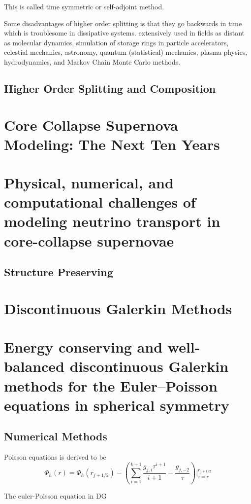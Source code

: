 This is called time symmetric or self-adjoint method.

Some disadvantages of higher order splitting is that they go backwards in time which is troublesome in dissipative systems. extensively used in fields as distant as molecular dynamics, simulation of storage rings in particle accelerators, celestial mechanics, astronomy, quantum (statistical) mechanics, plasma physics, hydrodynamics, and Markov Chain Monte Carlo methods.

\subsection{Higher Order Splitting and Composition}




\section{Core Collapse Supernova Modeling: The Next Ten Years}


\section{Physical, numerical, and computational challenges of modeling neutrino transport in core-collapse supernovae}

\subsection{Structure Preserving}


\section{Discontinuous Galerkin Methods}


\section{Energy conserving and well-balanced discontinuous Galerkin methods for the Euler–Poisson equations in spherical symmetry}

\subsection{Numerical Methods}

Poisson equations is derived to be 
\[
\Phi_h(r) = \Phi_h(r_{j + 1/2}) - \left(\sum^{k+1}_{i=1} \frac{g_{j,i}\tau^{i+1}}{i+1} - \frac{g_{j,-2}}{\tau}   \right) \Big|_{\tau =r}^{r_{j+1/2}}
  \]

  The euler-Poisson equation in DG
  

